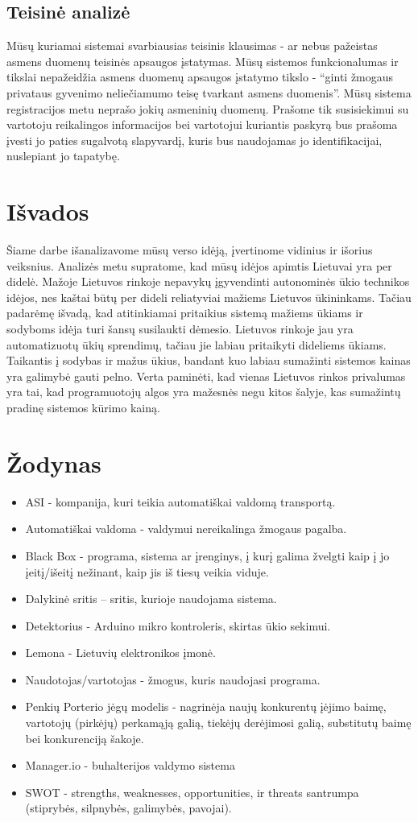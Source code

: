 \documentclass[oneside]{VUMIFPSkursinis}
\begin{document}
	\subsection{Teisinė analizė}
Mūsų kuriamai sistemai svarbiausias teisinis klausimas - ar nebus pažeistas asmens duomenų teisinės apsaugos įstatymas. Mūsų sistemos funkcionalumas ir tikslai nepažeidžia asmens duomenų apsaugos įstatymo tikslo - “ginti žmogaus privataus gyvenimo neliečiamumo teisę tvarkant asmens duomenis”. Mūsų sistema registracijos metu neprašo jokių asmeninių duomenų. Prašome tik susisiekimui su vartotoju reikalingos informacijos bei vartotojui kuriantis paskyrą bus prašoma įvesti jo paties sugalvotą slapyvardį, kuris bus naudojamas jo identifikacijai, nuslepiant jo tapatybę.
\section{Išvados}
	Šiame darbe išanalizavome mūsų verso idėją, įvertinome vidinius ir išorius veiksnius. Analizės metu supratome, kad mūsų idėjos apimtis Lietuvai yra per didelė. Mažoje Lietuvos rinkoje nepavykų įgyvendinti autonominės ūkio technikos idėjos, nes kaštai būtų per dideli reliatyviai mažiems Lietuvos ūkininkams. Tačiau padarėmę išvadą, kad atitinkiamai pritaikius sistemą mažiems ūkiams ir sodyboms idėja turi šansų susilaukti dėmesio. Lietuvos rinkoje jau yra automatizuotų ūkių sprendimų, tačiau jie labiau pritaikyti dideliems ūkiams. Taikantis į sodybas ir mažus ūkius, bandant kuo labiau sumažinti sistemos kainas yra galimybė gauti pelno. Verta paminėti, kad vienas Lietuvos rinkos privalumas yra tai, kad programuotojų algos yra mažesnės negu kitos šalyje, kas sumažintų pradinę sistemos kūrimo kainą.
	
 
\section{Žodynas}
\begin{itemize}
\item ASI - kompanija, kuri teikia automatiškai valdomą transportą.
\item Automatiškai valdoma - valdymui nereikalinga žmogaus pagalba.
\item Black Box - programa, sistema ar įrenginys, į kurį galima žvelgti kaip į jo įeitį/išeitį nežinant, kaip jis iš tiesų veikia viduje.
\item Dalykinė sritis – sritis, kurioje naudojama sistema.
\item Detektorius - Arduino mikro kontroleris, skirtas ūkio sekimui.
\item Lemona - Lietuvių elektronikos įmonė.
\item Naudotojas/vartotojas - žmogus, kuris naudojasi programa.
\item Penkių Porterio jėgų modelis - nagrinėja naujų konkurentų įėjimo baimę, vartotojų (pirkėjų) perkamąją galią, tiekėjų derėjimosi galią, substitutų baimę bei konkurenciją šakoje.
\item Manager.io - buhalterijos valdymo sistema
\item SWOT - strengths, weaknesses, opportunities, ir threats santrumpa (stiprybės, silpnybės, galimybės, pavojai).
\end{itemize}
\end{document}
